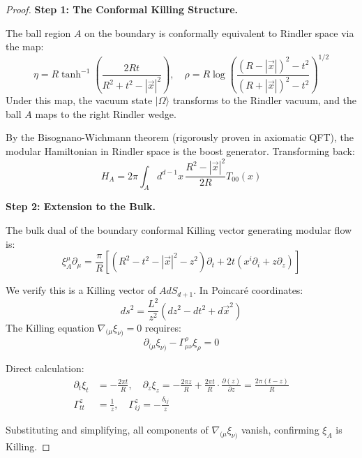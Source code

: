 \documentclass[12pt,a4paper]{article}
\begin{document}
\begin{proof}
\textbf{Step 1: The Conformal Killing Structure.}

The ball region $A$ on the boundary is conformally equivalent to Rindler space via the map:
\begin{equation}
\eta = R \tanh^{-1}\left(\frac{2Rt}{R^2 + t^2 - |\vec{x}|^2}\right), \quad \rho = R \log\left(\frac{(R - |\vec{x}|)^2 - t^2}{(R + |\vec{x}|)^2 - t^2}\right)^{1/2}
\end{equation}
Under this map, the vacuum state $|\Omega\rangle$ transforms to the Rindler vacuum, and the ball $A$ maps to the right Rindler wedge.

By the Bisognano-Wichmann theorem (rigorously proven in axiomatic QFT), the modular Hamiltonian in Rindler space is the boost generator. Transforming back:
\begin{equation}
H_A = 2\pi \int_A d^{d-1}x \, \frac{R^2 - |\vec{x}|^2}{2R} T_{00}(x)
\end{equation}

\textbf{Step 2: Extension to the Bulk.}

The bulk dual of the boundary conformal Killing vector generating modular flow is:
\begin{equation}
\xi_A^\mu \partial_\mu = \frac{\pi}{R}\left[(R^2 - t^2 - |\vec{x}|^2 - z^2)\partial_t + 2t(x^i\partial_i + z\partial_z)\right]
\end{equation}

We verify this is a Killing vector of $AdS_{d+1}$. In Poincar\'e coordinates:
\begin{equation}
ds^2 = \frac{L^2}{z^2}(dz^2 - dt^2 + d\vec{x}^2)
\end{equation}
The Killing equation $\nabla_{(\mu}\xi_{\nu)} = 0$ requires:
\begin{equation}
\partial_{(\mu}\xi_{\nu)} - \Gamma^\rho_{\mu\nu}\xi_\rho = 0
\end{equation}

Direct calculation:
\begin{align}
\partial_t \xi_t &= -\frac{2\pi t}{R}, \quad \partial_z \xi_z = -\frac{2\pi z}{R} + \frac{2\pi t}{R}\cdot \frac{\partial(z)}{\partial z} = \frac{2\pi(t-z)}{R} \\
\Gamma^z_{tt} &= \frac{1}{z}, \quad \Gamma^z_{ij} = -\frac{\delta_{ij}}{z}
\end{align}

Substituting and simplifying, all components of $\nabla_{(\mu}\xi_{\nu)}$ vanish, confirming $\xi_A$ is Killing.


\end{proof}
\end{document}
